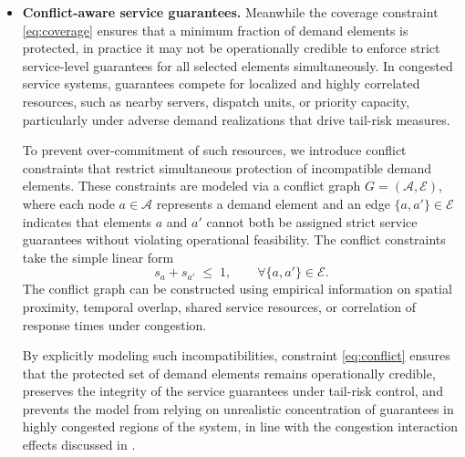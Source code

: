 \documentclass[letter,11pt, reqno]{amsart}
\def\A{\mathcal{A}}
\begin{document}
\begin{itemize}
The framework readily accommodates extensions of \eqref{eq:coverage} to account
for heterogeneity in demand importance or economic value. For example, letting
$w_a>0$ denote a weight associated with element $a$, a weighted coverage
constraint of the form
$$
\sum_{a\in\mathcal{A}} w_a s_a \;\ge\; \beta \sum_{a\in\mathcal{A}} w_a
$$
ensures protection of a prescribed fraction of total weighted demand. Moreover,
$\beta$ itself may be treated as a decision variable, enabling the model to
determine the maximum achievable coverage under a fixed budget or congestion
limit.

\item[-] \textbf{Conflict-aware service guarantees.}
Meanwhile the coverage constraint \eqref{eq:coverage} ensures that a minimum fraction of demand elements is protected, in practice it may not be operationally credible to enforce strict service-level guarantees for all selected elements simultaneously. In congested service systems, guarantees compete for localized and highly correlated resources, such as nearby servers, dispatch units, or priority capacity, particularly under adverse demand realizations that drive tail-risk
measures.

To prevent over-commitment of such resources, we introduce conflict constraints
that restrict simultaneous protection of incompatible demand elements. These
constraints are modeled via a conflict graph $G=(\A,\mathcal{E})$, where
each node $a\in\A$ represents a demand element and an edge
$\{a,a'\}\in\mathcal{E}$ indicates that elements $a$ and $a'$ cannot both be
assigned strict service guarantees without violating operational feasibility.
The conflict constraints take the simple linear form
\begin{equation}
s_a + s_{a'} \;\le\; 1,
\qquad \forall \{a,a'\}\in\mathcal{E}.
\label{eq:conflict}
\end{equation}
The conflict graph can be constructed using empirical information on spatial
proximity, temporal overlap, shared service resources, or correlation of response
times under congestion. 

By explicitly modeling such incompatibilities, constraint \eqref{eq:conflict}
ensures that the protected set of demand elements remains operationally credible,
preserves the integrity of the service guarantees under tail-risk control, and
prevents the model from relying on unrealistic concentration of guarantees in
highly congested regions of the system, in line with the congestion interaction
effects discussed in \cite{feldman2012conflicting}.


\end{itemize}
\end{document}
